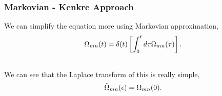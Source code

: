 \documentclass[letterpaper,10pt,english]{sphinxmanual}
\begin{document}
\subsubsection{Markovian - Kenkre Approach}
\label{nonequilibrium/quantumMasterEqn:markovian-kenkre-approach}
We can simplify the equation more using Markovian approximation,
\begin{gather}
\begin{split}\Omega_{mn}(t) = \delta(t) \left[\int_0^t d\tau \Omega_{mn}(\tau) \right].\end{split}\notag\\\begin{split}\end{split}\notag
\end{gather}
We can see that the Laplace transform of this is really simple,
\begin{gather}
\begin{split}\tilde \Omega_{mn}(\epsilon) =  \Omega_{mn}(0).\end{split}\notag\\\begin{split}\end{split}\notag
\end{gather}
\end{document}
